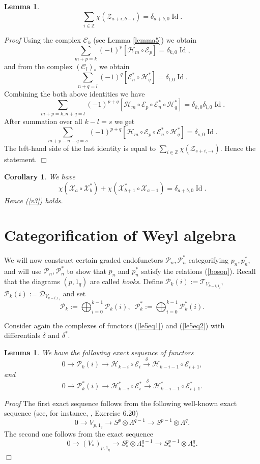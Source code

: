 \documentclass[11pt]{amsart}
\newcounter{theorem}
\newtheorem{lemma}[theo]{Lemma}
\newtheorem{corollary}[theo]{Corollary}
\renewenvironment{proof}{ \emph{Proof}}{$\Box$}
\begin{document}
\begin{lemma}\label{zchar}
$$\sum_{i\in\mathbb Z}\chi(\mathcal Z_{a+i,b-i})=\delta_{a+b,0}\operatorname{Id}.$$
\end{lemma}
\begin{proof} Using the complex $\mathcal C_k$ (see Lemma \ref{lemma5}) we obtain
$$\sum_{m+p=k} (-1)^p [\mathcal H_m\circ \mathcal E_p]=\delta_{k,0}\operatorname{Id},$$
and from the complex $(\mathcal C_l)_*$ we obtain
$$\sum_{n+q=l} (-1)^q  [\mathcal E^*_n\circ \mathcal H^*_q]=\delta_{l,0}\operatorname{Id}.$$
Combining the both above identities we have
$$\sum_{m+p=k,n+q=l} (-1)^{p+q} [\mathcal H_m\circ  \mathcal E_p\circ  \mathcal E^*_{n}\circ \mathcal H^*_{q}]=\delta_{k,0}\delta_{l,0}\operatorname{Id}.$$
After summation over all $k-l=s$ we get
$$\sum_{m+p-n-q=s} (-1)^{p+q} [\mathcal H_m\circ  \mathcal E_p\circ \mathcal E^*_n\circ \mathcal H^*_{q}]=\delta_{s,0}\operatorname{Id}.$$
The left-hand side of the last identity is equal to
$\sum_{i\in\mathbb Z}\chi(\mathcal Z_{s+i,-i})$.
Hence the statement.
\end{proof}
\begin{corollary} We have
$$\chi(\mathcal X_a\circ\mathcal X^*_b)+\chi(\mathcal  X^*_{b+1}\circ\mathcal X_{a-1})=\delta_{a+b,0}\operatorname{Id}.$$
Hence (\ref{v3}) holds.
\end{corollary}

\section{Categorification of Weyl algebra}
We will now construct  certain graded endofunctors $\mathcal P_n,\mathcal P^*_n$ categorifying
$p_n,p_n^*$, and will use   $\mathcal P_n,\mathcal P^*_n$ to show that $p_n$ and $p^*_n$ satisfy the relations
(\ref{boson}). Recall that the diagrams $(p,1_q)$ are called {\it hooks}.
Define $\mathcal P_k(i):=\mathcal T_{V_{k-i,1_i}}$, $\mathcal P_k(i):=\mathcal D_{V_{k-i,1_i}}$ and set
$$\mathcal P_k:=\bigoplus_{i=0}^{k-1}\mathcal P_k(i),\,\,\,\mathcal P^*_k:=\bigoplus_{i=0}^{k-1}\mathcal P^*_k(i).$$

Consider again the complexes of functors (\ref{le5eq1}) and
(\ref{le5eq2}) with differentials $\delta$ and $\delta^*$.

\begin{lemma}\label{hookkoszul} We have the following exact sequence of functors
$$0\to\mathcal P_k(i)\to\mathcal H_{k-i}\circ\mathcal E_i\xrightarrow{\delta}\mathcal H_{k-i-1}\circ\mathcal E_{i+1},$$ 
and
$$0\to\mathcal P^*_k(i)\to\mathcal H^*_{k-i}\circ\mathcal E^*_i\xrightarrow{\delta}\mathcal H^*_{k-i-1}\circ\mathcal E^*_{i+1}.$$
\end{lemma}
\begin{proof} The first exact sequence follows from the following well-known exact sequence (see, for instance, \cite{FH}, Exercise 6.20)
$$0\to V_{p,1_q}\to S^p\otimes \Lambda^{q-1}\to  S^{p-1}\otimes \Lambda^{q}.$$
The second one follows from the exact sequence
$$0\to (V_*)_{p,1_q}\to S_*^p\otimes \Lambda_*^{q-1}\to  S_*^{p-1}\otimes \Lambda_*^{q}.$$
\end{proof}
\end{document}
